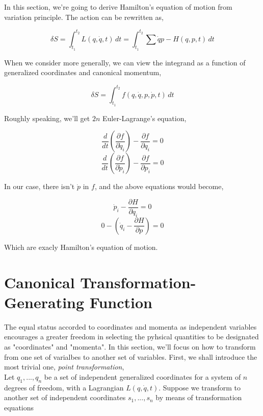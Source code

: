\documentclass[12pt]{article}
\numberwithin{equation}{section}
\begin{document}
In this section, we're going to derive Hamilton's equation of motion from variation principle. The action can be rewritten as,

\begin{center}
    \[ \delta S = \int_{t_1}^{t_2}  L(q, \dot{q}, t) \,dt = \int_{t_1}^{t_2} \sum{\dot{q}p} - H(q, p, t) \,dt \]
\end{center}

When we consider more generally, we can view the integrand as a function of generalized coordinates and canonical momentum,

\begin{center}
    \[ \delta S = \int_{t_1}^{t_2} f(q, \dot{q}, p, \dot{p}, t) \,dt \]
\end{center}

Roughly speaking, we'll get $2n$ Euler-Lagrange's equation,

\begin{center}
    \[ \frac{d}{dt} \left(\frac{\partial f}{\partial \dot{q}_i}\right)  - \frac{\partial f}{\partial q_i} = 0 \]
    \[ \frac{d}{dt} \left(\frac{\partial f}{\partial \dot{p}_i}\right)  - \frac{\partial f}{\partial p_i} = 0 \]
\end{center}

In our case, there isn't $\dot{p}$ in $f$, and the above equations would become,

\begin{center}
    \[ \dot{p}_i - \frac{\partial H}{\partial q_i} = 0 \]
    \[ 0 - \left( \dot{q}_i - \frac{\partial H}{\partial p} \right) = 0 \]
\end{center}

Which are exacly Hamilton's equation of motion.

\section{Canonical Transformation-Generating Function}

The equal status accorded to coordinates and momenta as independent variables encourages a greater freedom in selecting the pyhsical quantities to be designated as "coordinates" and "momenta". In this section, we'll focus on how to transform from one set of varialbes to another set of variables. First, we shall introduce the most trivial one, \textit{point transformation},
\\
Let $q_1, ..., q_n$ be a set of independent generalized coordinates for a system of $n$ degrees of freedom, with a Lagrangian $L(q, \dot{q}, t)$. Suppose we transform to another set of independent coordinates $s_1, ..., s_n$ by means of transformation equations
\end{document}
